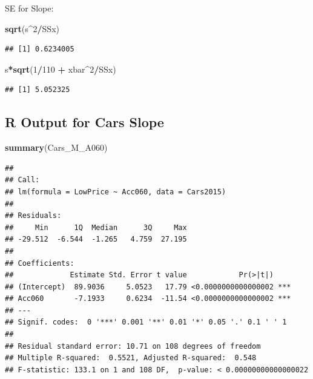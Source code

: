 \documentclass[]{book}
\newenvironment{Shaded}{\begin{snugshade}}{\end{snugshade}}
\newcommand{\KeywordTok}[1]{\textcolor[rgb]{0.13,0.29,0.53}{\textbf{#1}}}
\newcommand{\DecValTok}[1]{\textcolor[rgb]{0.00,0.00,0.81}{#1}}
\newcommand{\StringTok}[1]{\textcolor[rgb]{0.31,0.60,0.02}{#1}}
\newcommand{\OperatorTok}[1]{\textcolor[rgb]{0.81,0.36,0.00}{\textbf{#1}}}
\newcommand{\NormalTok}[1]{#1}
\begin{document}
SE for Slope:

\begin{Shaded}
\begin{Highlighting}[]
\KeywordTok{sqrt}\NormalTok{(s}\OperatorTok{^}\DecValTok{2}\OperatorTok{/}\NormalTok{SSx)}
\end{Highlighting}
\end{Shaded}

\begin{verbatim}
## [1] 0.6234005
\end{verbatim}

\begin{Shaded}
\begin{Highlighting}[]
\NormalTok{s}\OperatorTok{*}\KeywordTok{sqrt}\NormalTok{(}\DecValTok{1}\OperatorTok{/}\DecValTok{110} \OperatorTok{+}\StringTok{ }\NormalTok{xbar}\OperatorTok{^}\DecValTok{2}\OperatorTok{/}\NormalTok{SSx)}
\end{Highlighting}
\end{Shaded}

\begin{verbatim}
## [1] 5.052325
\end{verbatim}

\subsection{R Output for Cars Slope}\label{r-output-for-cars-slope}

\begin{Shaded}
\begin{Highlighting}[]
\KeywordTok{summary}\NormalTok{(Cars_M_A060)}
\end{Highlighting}
\end{Shaded}

\begin{verbatim}
## 
## Call:
## lm(formula = LowPrice ~ Acc060, data = Cars2015)
## 
## Residuals:
##     Min      1Q  Median      3Q     Max 
## -29.512  -6.544  -1.265   4.759  27.195 
## 
## Coefficients:
##             Estimate Std. Error t value            Pr(>|t|)    
## (Intercept)  89.9036     5.0523   17.79 <0.0000000000000002 ***
## Acc060       -7.1933     0.6234  -11.54 <0.0000000000000002 ***
## ---
## Signif. codes:  0 '***' 0.001 '**' 0.01 '*' 0.05 '.' 0.1 ' ' 1
## 
## Residual standard error: 10.71 on 108 degrees of freedom
## Multiple R-squared:  0.5521, Adjusted R-squared:  0.548 
## F-statistic: 133.1 on 1 and 108 DF,  p-value: < 0.00000000000000022
\end{verbatim}
\end{document}
